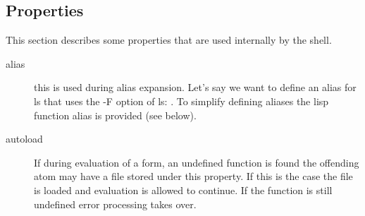 %
%
%
%
%
\subsection{Properties}
This section describes some properties that are used internally by the
shell.

\begin{description}
\item[alias] this is used during alias expansion.  Let's say we want
  to define an alias for ls that uses the -F option of ls: .  To simplify defining aliases the lisp function
  alias is provided (see below).
\item[autoload] If during evaluation of a form, an undefined function
  is found the offending atom may have a file stored under this
  property. If this is the case the file is loaded and evaluation is
  allowed to continue.  If the function is still undefined error
  processing takes over.
\end{description}

